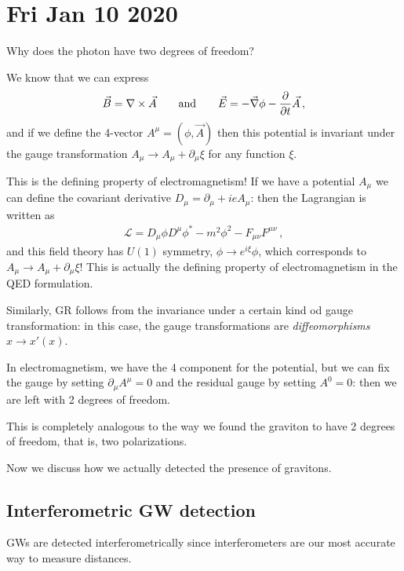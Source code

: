 \documentclass[main.tex]{subfiles}
\begin{document}
\section*{Fri Jan 10 2020}

Why does the photon have two degrees of freedom? 

We know that we can express 
%
\begin{align}
\vec{B} = \nabla \times \vec{A} \qquad \text{and} \qquad
\vec{E} = - \vec{\nabla} \phi - \pdv{}{t} \vec{A} 
\,,
\end{align}
%
and if we define the 4-vector \(A^{\mu } = (\phi , \vec{A})\) then this potential is invariant under the gauge transformation \(A_{\mu } \rightarrow A_{\mu } + \partial_{\mu } \xi\) for any function \(\xi \). 

This is the defining property of electromagnetism! If we have a potential \(A_{\mu }\) we can define the covariant derivative \(D_{\mu } = \partial_{\mu } + ie A_{\mu }\): then the Lagrangian is written as 
%
\begin{align}
\mathcal{L} = D_{\mu } \phi  D^{\mu } \phi^{*} - m^2 \phi^2 - F_{\mu \nu } F^{\mu \nu }
\,,
\end{align}
%
and this field theory has \(U(1)\) symmetry, \(\phi \rightarrow e^{i \xi } \phi \), which corresponds to \(A_{\mu } \rightarrow A_{\mu } + \partial_{\mu } \xi \)! This is actually the defining property of electromagnetism in the QED formulation.

Similarly, GR follows from the invariance under a certain kind od gauge transformation: in this case, the gauge transformations are \emph{diffeomorphisms} \(x \rightarrow x' (x)\). 

In electromagnetism, we have the 4 component for the potential, but we can fix the gauge by setting \(\partial_{\mu }  A^{\mu } = 0\) and the residual gauge by setting \(A^{0} = 0\): then we are left with 2 degrees of freedom. 

This is completely analogous to the way we found the graviton to have 2 degrees of freedom, that is, two polarizations. 

Now we discuss how we actually detected the presence of gravitons. 

\subsection{Interferometric GW detection}

GWs are detected interferometrically since interferometers are our most accurate way to measure distances. 
\end{document}
